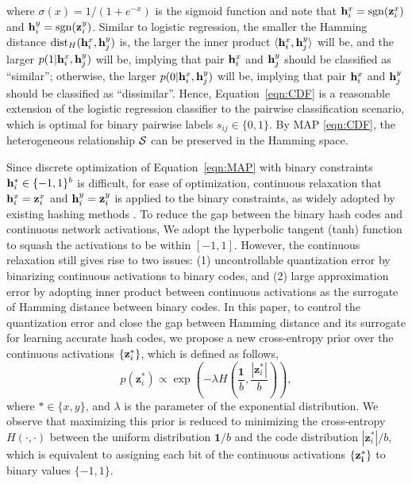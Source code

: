 \documentclass{article}
\begin{document}
where $\sigma \left( x \right) = {1}/({{1 + {e^{ - x}}}})$ is the sigmoid function and note that ${\bf h}_i^x = \operatorname{sgn}({{\bf z}_i^x})$ and ${\bf h}_i^y = \operatorname{sgn}({{\bf z}_i^y})$. Similar to logistic regression, the smaller the Hamming distance ${\text{dis}}{{\textrm{t}}_H}( {{{\bf{h}}_i^x},{{\bf{h}}_j^y}} )$ is, the larger the inner product ${\langle {{{\bf{h}}_i^x},{{\bf{h}}_j^y}} \rangle }$ will be, and the larger $p( {1|{{\bf{h}}_i^x},{{\bf{h}}_j^y}} )$ will be, implying that pair ${\bf h}_i^x$ and ${\bf h}_j^y$ should be classified as ``similar''; otherwise, the larger $p( {0|{{\bf{h}}_i^x},{{\bf{h}}_j^y}} )$ will be, implying that pair ${\bf h}_i^x$ and ${\bf h}_j^y$ should be classified as ``dissimilar''. Hence, Equation~\eqref{eqn:CDF} is a reasonable extension of the logistic regression classifier to the pairwise classification scenario, which is optimal for binary pairwise labels $s_{ij}\in\{0,1\}$. By MAP \eqref{eqn:CDF}, the heterogeneous relationship ${\cal S}$ can be preserved in the Hamming space.

Since discrete optimization of Equation~\eqref{eqn:MAP} with binary constraints ${\bf h}_i^\ast\in\{-1,1\}^b$ is difficult, for ease of optimization, continuous relaxation that ${\bf h}_i^x = {{\bf z}_i^x}$ and ${\bf h}_i^y = {{\bf z}_i^y}$ is applied to  the binary constraints, as widely adopted by existing hashing methods \cite{cite:Arxiv14Hashing}. To reduce the gap between the binary hash codes and continuous network activations, We adopt the hyperbolic tangent (tanh) function to squash the activations to be within $[-1,1]$. However, the continuous relaxation still gives rise to two issues: (1) uncontrollable quantization error by binarizing continuous activations to binary codes, and (2) large approximation error by adopting inner product between continuous activations as the surrogate of Hamming distance between binary codes. In this paper, to control the quantization error and close the gap between Hamming distance and its surrogate for learning accurate hash codes, we propose a new cross-entropy prior over the continuous activations $\{{\bf z}_i^\ast\}$, which is defined as follows,
\begin{equation}\label{eqn:prior}
  p\left( {{\mathbf{z}}_i^ * } \right) \propto \exp \left( { - \lambda H\left( {\frac{{\mathbf{1}}}{b},\frac{{\left| {{\mathbf{z}}_i^ * } \right|}}{b}} \right)} \right),
\end{equation}
where $\ast\in\{x,y\}$, and $\lambda$ is the parameter of the exponential distribution. We observe that maximizing this prior is reduced to minimizing the cross-entropy $H(\cdot,\cdot)$ between the uniform distribution ${{\mathbf{1}}/b}$ and the code distribution ${\left| {{\mathbf{z}}_i^ * } \right|/b}$, which is equivalent to assigning each bit of the continuous activations $\{ \bf{z}_i^\ast \}$ to binary values $\{ -1, 1 \}$.
\end{document}
